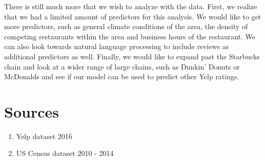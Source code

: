 \documentclass{article}
\begin{document}
\begin{multicols}{2}
There is still much more that we wish to analyze with the data. First, we realize that we had a limited amount of predictors for this analysis. We would like to get more predictors, such as general climate conditions of the area, the density of competing restaurants within the area and business hours of the restaurant. We can also look towards natural language processing to include reviews as additional predictors as well. Finally, we would like to expand past the Starbucks chain and look at a wider range of large chains, such as Dunkin’  Donuts or McDonalds and see if our model can be used to predict other Yelp ratings.

\section{Sources}

\begin{enumerate}[noitemsep,topsep=8pt,parsep=0pt,partopsep=0pt]
\item Yelp dataset 2016
\item US Census dataset 2010 - 2014
\end{enumerate}

\end{multicols}
\end{document}

